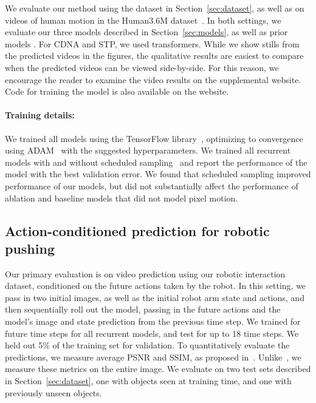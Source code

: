 \documentclass{article}
\newcommand{\atari}{acvpa-oglls-15}
\newcommand{\nyu}{vpbmse-mcl-16}
\begin{document}
We evaluate our method using the dataset in Section~\ref{sec:dataset}, as well as on videos of human motion in
the Human3.6M dataset~\cite{ipos-h36m-14}.
In both settings, we evaluate our three models described in Section~\ref{sec:models}, as well as prior models \cite{\nyu,\atari}. For CDNA and STP, we
used  transformers.
While we show stills from the predicted videos in the figures, the qualitative results are easiest to compare when the predicted videos can be viewed side-by-side.
For this reason, we encourage the reader to examine the video results on the supplemental website. Code for training the model
is also available on the website.

\vspace{-0.07in}
\paragraph{Training details:} We trained all models using the TensorFlow
library~\cite{aabbc-tf-15}, optimizing to convergence using ADAM~\cite{kb-adam-15} with the suggested hyperparameters.
We trained all recurrent models with and without scheduled sampling~\cite{bvjs-ss-15} and report the performance of the model with the best validation error.
We found that scheduled sampling improved performance of our models, but did not substantially affect the performance of ablation and baseline
models that did not model pixel motion.

\subsection{Action-conditioned prediction for robotic pushing}

Our primary evaluation is on video prediction using our robotic interaction dataset, conditioned on the future actions taken by the robot.
In this setting, we pass in two initial images, as well as the initial robot arm state and actions, and then sequentially roll out the model,
passing in the future actions and the model's image and state prediction from the previous time step.
We trained for  future time steps for all recurrent models, and test for up to 18 time steps. We held out 5\% of
the training set for validation. To quantitatively evaluate the predictions, we measure average PSNR and SSIM, as proposed in~\cite{\nyu}.
Unlike~\cite{\nyu}, we measure these metrics on the entire image.
We evaluate on two test sets described in Section~\ref{sec:dataset}, one with objects seen at training time, and one with previously unseen objects.
\end{document}
